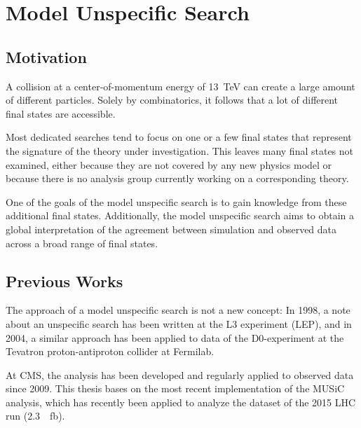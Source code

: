 
\chapter{Model Unspecific Search}

\section{Motivation}
A collision at a center-of-momentum energy of \SI{13}{\TeV} can create a large amount of different particles. Solely by combinatorics, it follows that a lot of different final states are accessible.

Most dedicated searches tend to focus on one or a few final states that represent the signature of the theory under investigation. This leaves many final states not examined, either because they are not covered by any new physics model or because there is no analysis group currently working on a corresponding theory.

One of the goals of the model unspecific search is to gain knowledge from these additional final states. Additionally, the model unspecific search aims to obtain a global interpretation of the agreement between simulation and observed data across a broad range of final states.

\section{Previous Works}
The approach of a model unspecific search is not a new concept: In 1998, a note about an unspecific search has been written at the L3 experiment (\ac{LEP})\cite{Hebbeker:GlobalComparisonL3}, and in 2004, a similar approach has been applied to data of the D0-experiment at the Tevatron proton-antiproton collider at Fermilab\cite{Biallass:ModelIndependentSearch}.

At \ac{CMS}, the analysis has been developed and regularly applied to observed data since 2009\cite{Schmitz:ModelUnspecificSearch,Hof:ImplementationModelIndependent,Dietz-Laursonn:ModelUnspecificSearch,Olschewski:StudyAlternativeStatistical,Brodski:ModelUnspecificSearch,Pieta:MUSiCModelUnspecific,Papacz:ModelUnspecificSearch,Albert:ExtensionModelUnspecific,Roemer:ModelUnspecificSearch,CMS:CMS-PAS-EXO-14-016,Knutzen:softwarereinterpretationmodel,Durchardt:MUSiCModelUnspecific}. 
This thesis bases on the most recent implementation of the \ac{MUSiC} analysis, which has recently been applied to analyze the dataset of the 2015 \ac{LHC} run\cite{Roemer:ModelUnspecificSearch} (\SI{2.3}{\per\femto\barn}).

